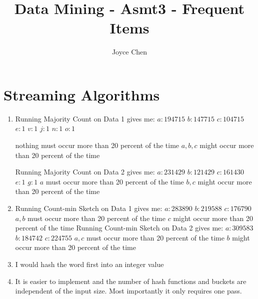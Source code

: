 \documentclass[11pt]{article}
\title{Data Mining - Asmt3 - Frequent Items}
\author{Joyce Chen}
\begin{document}
\maketitle

\section{Streaming Algorithms}
\begin{enumerate}[label=\textbf{\Alph*:}]
\item
Running Majority Count on Data 1 gives me:
$a : 194715$
$b : 147715$
$c : 104715$
$e : 1$
$v : 1$
$j : 1$
$n : 1$
$o : 1$

nothing must occur more than 20 percent of the time 
$a, b, c$ might occur more than 20 percent of the time


Running Majority Count on Data 2 gives me:
$a : 231429$
$b : 121429$
$c : 161430$
$e : 1$
$g : 1$
\newline
$a$ must occur more than 20 percent of the time
$b, c$  might occur more than 20 percent of the time
\item
Running Count-min Sketch on Data 1 gives me:
$a  : 283890$
$b :  219588$
$c :  176790$
\newline
$a,b$ must occur more than 20 percent of the time
\newline
$c$  might occur more than 20 percent of the time
\newline
Running Count-min Sketch on Data 2 gives me:
$a  : 309583$
$b : 184742$
$c :  224755$
\newline
$a,c$ must occur more than 20 percent of the time
\newline
$b$  might occur more than 20 percent of the time

\item
I would hash the word first into an integer value

\item
It is easier to implement and the number of hash functions and buckets are independent of the input size. Most importantly it only requires one pass.
\end{enumerate}
\end{document}
